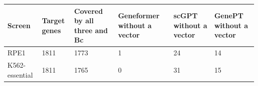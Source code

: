 \begin{tabular}{llllll}
\toprule
Screen & Target genes & Covered by all three and Bc & Geneformer without a vector & scGPT without a vector & GenePT without a vector \\
\midrule
RPE1 & 1811 & 1773 & 1 & 24 & 14 \\
K562-essential & 1811 & 1765 & 0 & 31 & 15 \\
\bottomrule
\end{tabular}

